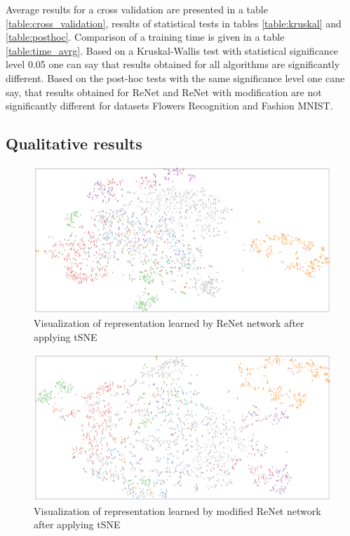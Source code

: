 \documentclass[a4paper, 10 pt, conference]{ieeeconf}
\begin{document}
Average results for a cross validation are presented in a table \ref{table:cross_validation}, results of statistical tests in tables \ref{table:kruskal} and \ref{table:posthoc}. Comparison of a training time is given in a table \ref{table:time_avrg}. Based on a Kruskal-Wallis test with statistical significance level 0.05 one can say that results obtained for all algorithms are significantly different. Based on the post-hoc tests with the same significance level one cane say, that results obtained for ReNet and ReNet with modification are not significantly different for datasets Flowers Recognition and Fashion MNIST.

\subsection{Qualitative results}

\begin{figure}
\centering
	\includegraphics[width=1.0\textwidth]{img/tSNE_ReNet.png}
	\caption{Visualization of representation learned by ReNet network after applying tSNE}
	\label{fig:tSNE_ReNet}
\end{figure}

\begin{figure}
\centering
	\includegraphics[width=1.0\textwidth]{img/tSNE_modif_ReNet.png}
	\caption{Visualization of representation learned by modified ReNet network after applying tSNE}
	\label{fig:tSNE_modif_ReNet}
\end{figure}
\end{document}
